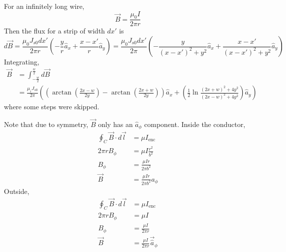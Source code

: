 \documentclass[answers]{exam}
\begin{document}
\begin{questions}
\begin{solution}
    For an infinitely long wire,
    $$\vec B = \frac{\mu_0 I}{2\pi r}$$
    Then the flux for a strip of width $dx'$ is
    $$d\vec B = \frac{\mu_0 J_{s0}dx'}{2\pi r} \left(-\frac{y}{r} \hat a_x + \frac{x-x'}{r} \hat a_y\right) = \frac{\mu_0 J_{s0}dx'}{2\pi} \left(-\frac{y}{(x-x')^2+y^2} \hat a_x + \frac{x-x'}{(x-x')^2+y^2} \hat a_y\right)$$
    Integrating,
    \begin{align*}
        \vec B &= \int_{-\frac{w}{2}}^{\frac{w}{2}} d\vec B \\
               &= \frac{\mu_i J_{s0}}{2\pi}\left(\left(\arctan\left(\frac{2x-w}{2y}\right) - \arctan\left(\frac{2x+w}{2y}\right)\right)\hat a_x + \left(\frac{1}{2}\ln\frac{(2x+w)^2+4y^2}{(2x-w)^2+4y^2}\right)\hat a_y\right)
    \end{align*}
    where some steps were skipped.
\end{solution}


\begin{solution}
    Note that due to symmetry, $\vec B$ only has an $\hat a_\phi$ component. Inside the conductor,
    \begin{align*}
        \oint_C \vec B \cdot d\vec l &= \mu I_{\text{enc}} \\
        2\pi rB_\phi &= \mu I \frac{r^2}{b^2} \\
        B_\phi &= \frac{\mu I r}{2\pi b^2} \\
        \vec B &= \frac{\mu Ir}{2\pi b^2} \hat a_\phi
    \end{align*}
    Outside,
    \begin{align*}
        \oint_C \vec B \cdot d\vec l &= \mu I_{\text{enc}} \\
        2\pi r B_\phi &= \mu I \\
        B_\phi &= \frac{\mu I}{2\pi r} \\
        \vec B &= \frac{\mu I}{2\pi r} \vec \hat a_\phi
    \end{align*}
\end{solution}



\end{questions}
\end{document}
